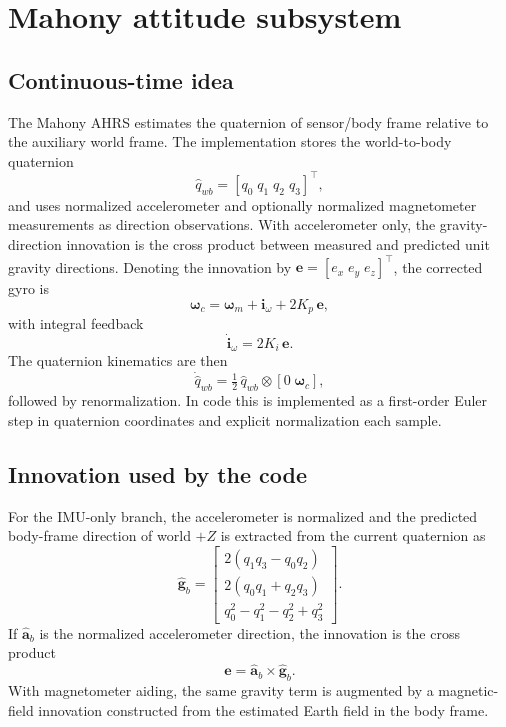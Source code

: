 \documentclass[conference]{IEEEtran}
\newcommand{\vct}[1]{\bm{#1}}
\begin{document}
\section{Mahony attitude subsystem}
\subsection{Continuous-time idea}
The Mahony AHRS estimates the quaternion of sensor/body frame relative to the auxiliary world frame. The implementation stores the world-to-body quaternion
\begin{equation}
\hat{q}_{wb} = [q_0\; q_1\; q_2\; q_3]^\top,
\end{equation}
and uses normalized accelerometer and optionally normalized magnetometer measurements as direction observations. With accelerometer only, the gravity-direction innovation is the cross product between measured and predicted unit gravity directions. Denoting the innovation by $\vct{e}=[e_x\;e_y\;e_z]^\top$, the corrected gyro is
\begin{equation}
\vct{\omega}_c = \vct{\omega}_m + \vct{i}_{\omega} + 2K_p\,\vct{e},
\end{equation}
with integral feedback
\begin{equation}
\dot{\vct{i}}_{\omega} = 2K_i\,\vct{e}.
\end{equation}
The quaternion kinematics are then
\begin{equation}
\dot{\hat{q}}_{wb} = \tfrac12\,\hat{q}_{wb}\otimes [0\;\vct{\omega}_c],
\end{equation}
followed by renormalization. In code this is implemented as a first-order Euler step in quaternion coordinates and explicit normalization each sample.

\subsection{Innovation used by the code}
For the IMU-only branch, the accelerometer is normalized and the predicted body-frame direction of world $+Z$ is extracted from the current quaternion as
\begin{equation}
\hat{\vct{g}}_b =
\begin{bmatrix}
2(q_1 q_3 - q_0 q_2)\\
2(q_0 q_1 + q_2 q_3)\\
q_0^2 - q_1^2 - q_2^2 + q_3^2
\end{bmatrix}.
\end{equation}
If $\hat{\vct{a}}_b$ is the normalized accelerometer direction, the innovation is the cross product
\begin{equation}
\vct{e} = \hat{\vct{a}}_b \times \hat{\vct{g}}_b.
\end{equation}
With magnetometer aiding, the same gravity term is augmented by a magnetic-field innovation constructed from the estimated Earth field in the body frame.
\end{document}
